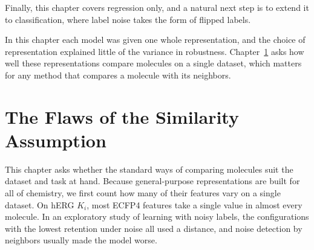 Finally, this chapter covers regression only, and a natural next step is to extend it to classification, where label noise takes the form of flipped labels.

In this chapter each model was given one whole representation, and the choice of representation explained little of the variance in robustness. Chapter~\ref{chap:flaws} asks how well these representations compare molecules on a single dataset, which matters for any method that compares a molecule with its neighbors.
\chapter{The Flaws of the Similarity Assumption}\label{chap:flaws}

This chapter asks whether the standard ways of comparing molecules suit the dataset and task at hand. Because general-purpose representations are built for all of chemistry, we first count how many of their features vary on a single dataset. On hERG $K_i$, most ECFP4 features take a single value in almost every molecule. In an exploratory study of learning with noisy labels, the configurations with the lowest retention under noise all used a distance, and noise detection by neighbors usually made the model worse.



